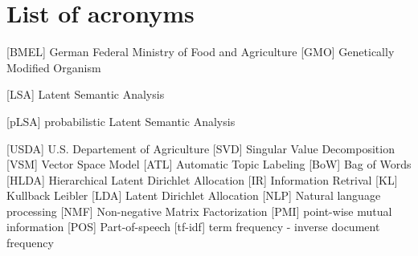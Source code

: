\section*{List of acronyms}
\begin{acronym}
	\setlength{\parskip}{0ex}
	\setlength{\itemsep}{1ex}
	 [BMEL] {German Federal Ministry of Food and Agriculture}
	 [GMO] {Genetically Modified Organism}
	
	
		[LSA] {Latent Semantic Analysis}
	
	 [pLSA] {probabilistic Latent Semantic Analysis}
	
	 [USDA] {U.S. Departement of Agriculture}
	 [SVD] {Singular Value Decomposition}
	 [VSM] {Vector Space Model}	
	 [ATL] {Automatic Topic Labeling}
	 [BoW] {Bag of Words}
	[HLDA] {Hierarchical Latent Dirichlet Allocation}
		[IR] {Information Retrival}
		[KL] {Kullback Leibler}
		[LDA] {Latent Dirichlet Allocation}
	 [NLP] {Natural language processing}
	 	[NMF] {Non-negative Matrix Factorization}
	 [PMI] {point-wise mutual information}
	 [POS] {Part-of-speech}
	 [tf-idf] {term frequency - inverse document frequency}
	
\end{acronym}
